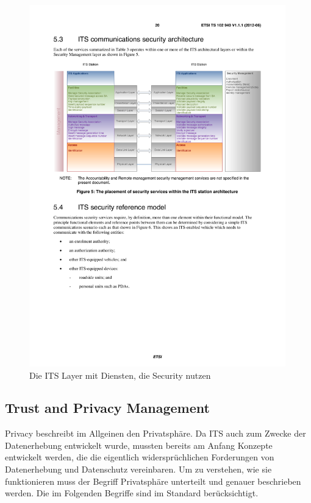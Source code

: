 \begin{figure}
	\includegraphics[width=0.99\textwidth]{content/images/02_architektur/securityDienste.pdf}
	\caption{Die ITS Layer mit Diensten, die Security nutzen \cite{ts102940}}
	\label{fig:architektur_securityDienste}
\end{figure}

\subsection{Trust and Privacy Management \label{architektur_TrustAndPrivacyManagement}}
Privacy beschreibt im Allgeinen den Privatsphäre. Da \ac{ITS} auch zum Zwecke der Datenerhebung entwickelt wurde, mussten bereits am Anfang Konzepte entwickelt werden, die die eigentlich widersprüchlichen Forderungen von Datenerhebung und Datenschutz vereinbaren. Um zu verstehen, wie sie funktionieren muss der Begriff Privatsphäre unterteilt und genauer beschrieben werden. Die im Folgenden Begriffe sind im Standard berücksichtigt. 

